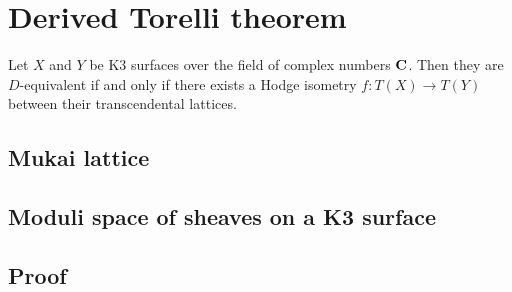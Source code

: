 \section{Derived Torelli theorem}

\begin{theorem}
    Let $X$ and $Y$ be K3 surfaces over the field of complex numbers $\mathbf C$. Then they are $D$-equivalent if and only if there exists a Hodge isometry $f\colon T(X) \to T(Y)$ between their transcendental lattices.
\end{theorem}

\subsection{Mukai lattice}
\subsection{Moduli space of sheaves on a K3 surface}
\subsection{Proof}

